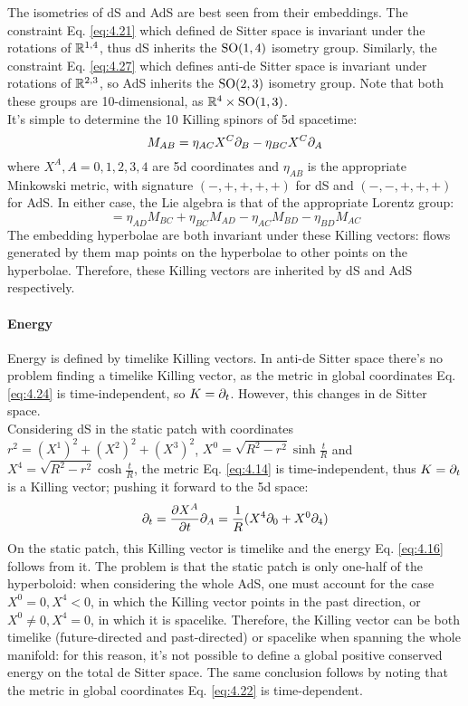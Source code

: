 The isometries of dS and AdS are best seen from their embeddings.
The constraint Eq. \ref{eq:4.21} which defined de Sitter space is invariant under the rotations of $ \mathbb{R}^{1,4} $, thus dS inherits the $ \mathrm{SO}(1,4) $ isometry group. Similarly, the constraint Eq. \ref{eq:4.27} which defines anti-de Sitter space is invariant under rotations of $ \mathbb{R}^{2,3} $, so AdS inherits the $ \mathrm{SO}(2,3) $ isometry group. Note that both these groups are 10-dimensional, as $ \mathbb{R}^4 \times \mathrm{SO}(1,3) $.\\
It's simple to determine the 10 Killing spinors of 5d spacetime:
\begin{equation*}
  M_{AB} = \eta_{AC} X^C \partial_B - \eta_{BC} X^C \partial_A
\end{equation*}
where $ X^A, A = 0,1,2,3,4 $ are 5d coordinates and $ \eta_{AB} $ is the appropriate Minkowski metric, with signature $ (-,+,+,+,+) $ for dS and $ (-,-,+,+,+) $ for AdS. In either case, the Lie algebra is that of the appropriate Lorentz group:
\begin{equation*}
  [M_{AB}, M_{CD}] = \eta_{AD} M_{BC} + \eta_{BC} M_{AD} - \eta_{AC} M_{BD} - \eta_{BD} M_{AC}
\end{equation*}
The embedding hyperbolae are both invariant under these Killing vectors: flows generated by them map points on the hyperbolae to other points on the hyperbolae. Therefore, these Killing vectors are inherited by dS and AdS respectively.

\paragraph{Energy}

Energy is defined by timelike Killing vectors. In anti-de Sitter space there's no problem finding a timelike Killing vector, as the metric in global coordinates Eq. \ref{eq:4.24} is time-independent, so $ K = \partial_t $. However, this changes in de Sitter space.\\
Considering dS in the static patch with coordinates $ r^2 = (X^1)^2 + (X^2)^2 + (X^3)^2 $, $ X^0 = \sqrt{R^2 - r^2} \sinh \frac{t}{R} $ and $ X^4 = \sqrt{R^2 - r^2} \cosh \frac{t}{R} $, the metric Eq. \ref{eq:4.14} is time-independent, thus $ K = \partial_t $ is a Killing vector; pushing it forward to the 5d space:
\begin{equation*}
  \partial_t = \frac{\partial X^A}{\partial t} \partial_A = \frac{1}{R} ( X^4 \partial_0 + X^0 \partial_4 )
\end{equation*}
On the static patch, this Killing vector is timelike and the energy Eq. \ref{eq:4.16} follows from it. The problem is that the static patch is only one-half of the hyperboloid: when considering the whole AdS, one must account for the case $ X^0 = 0, X^4 < 0 $, in which the Killing vector points in the past direction, or $ X^0 \neq 0, X^4 = 0 $, in which it is spacelike. Therefore, the Killing vector can be both timelike (future-directed and past-directed) or spacelike when spanning the whole manifold: for this reason, it's not possible to define a global positive conserved energy on the total de Sitter space. The same conclusion follows by noting that the metric in global coordinates Eq. \ref{eq:4.22} is time-dependent.

